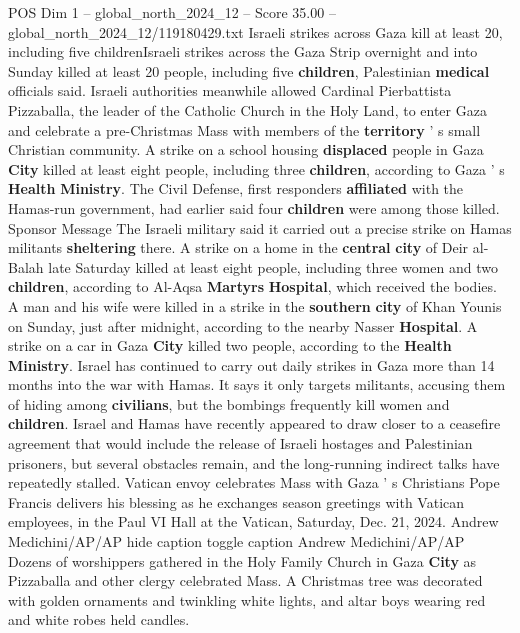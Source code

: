 \begin{textsample}{POS Dim 1 – global\_north\_2024\_12 – Score 35.00 – global\_north\_2024\_12/119180429.txt}  \label{ex:f1_pos_225}
Israeli strikes across Gaza kill at least 20, including five childrenIsraeli strikes across the Gaza Strip overnight and into Sunday killed at least 20 people, including five \textbf{children}, Palestinian \textbf{medical} officials said.
Israeli authorities meanwhile allowed Cardinal Pierbattista Pizzaballa, the leader of the Catholic Church in the Holy Land, to enter Gaza and celebrate a pre-Christmas Mass with members of the \textbf{territory} ' s small Christian community.
A strike on a school housing \textbf{displaced} people in Gaza \textbf{City} killed at least eight people, including three \textbf{children}, according to Gaza ' s \textbf{Health} \textbf{Ministry}.
The Civil Defense, first responders \textbf{affiliated} with the Hamas-run government, had earlier said four \textbf{children} were among those killed.
Sponsor Message The Israeli military said it carried out a precise strike on Hamas militants \textbf{sheltering} there.
A strike on a home in the \textbf{central} \textbf{city} of Deir al-Balah late Saturday killed at least eight people, including three women and two \textbf{children}, according to Al-Aqsa \textbf{Martyrs} \textbf{Hospital}, which received the bodies.
A man and his wife were killed in a strike in the \textbf{southern} \textbf{city} of Khan Younis on Sunday, just after midnight, according to the nearby Nasser \textbf{Hospital}.
A strike on a car in Gaza \textbf{City} killed two people, according to the \textbf{Health} \textbf{Ministry}.
Israel has continued to carry out daily strikes in Gaza more than 14 months into the war with Hamas.
It says it only targets militants, accusing them of hiding among \textbf{civilians}, but the bombings frequently kill women and \textbf{children}.
Israel and Hamas have recently appeared to draw closer to a ceasefire agreement that would include the release of Israeli hostages and Palestinian prisoners, but several obstacles remain, and the long-running indirect talks have repeatedly stalled.
Vatican envoy celebrates Mass with Gaza ' s Christians Pope Francis delivers his blessing as he exchanges season greetings with Vatican employees, in the Paul VI Hall at the Vatican, Saturday, Dec. 21, 2024.
Andrew Medichini/AP/AP hide caption toggle caption Andrew Medichini/AP/AP Dozens of worshippers gathered in the Holy Family Church in Gaza \textbf{City} as Pizzaballa and other clergy celebrated Mass.
A Christmas tree was decorated with golden ornaments and twinkling white lights, and altar boys wearing red and white robes held candles.

\end{textsample}
